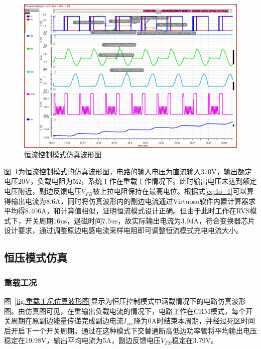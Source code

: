 \begin{figure}[htbp] 
    \centering
    \includegraphics[width=0.8\linewidth]{figures/constant_current.png}
    \caption{恒流控制模式仿真波形图}
    \label{fig:恒流控制模式仿真波形图}
\end{figure} 

图~\ref{fig:恒流控制模式仿真波形图}为恒流控制模式的仿真波形图，电路的输入电压为直流输入370V，输出额定电压20V，负载电阻为5Ω，系统工作在重载工作情况下。此时输出电压未达到额定电压附近，副边反馈电压$V_{FB}$被上拉电阻保持在最高电位。根据式\eqref{eq:Io_1}可以算得输出电流为8.6A，同时将仿真波形内的副边电流通过Virtuoso软件内置计算器求平均得8.406A，和计算值相似，证明恒流模式设计正确。但由于此时工作在RVS模式下，开关周期16us，退磁时间7.5us，故实际输出电流为3.94A，符合变换器芯片设计要求，通过调整原边电感电流采样电阻即可调整恒流模式充电电流大小。

\subsection{恒压模式仿真}

\subsubsection{重载工况}


图~\ref{fig:重载工况仿真波形图}显示为恒压控制模式中满载情况下的电路仿真波形图。由仿真图可见，在重输出负载电流的情况下，电路工作在CRM模式，每个开关周期在原副边能量传递完成副边电流$I_{sec}$降为0A时结束本周期，并经过死区时间后开启下一个开关周期。通过在这种模式下交替通断高低边功率管将平均输出电压稳定在19.98V，输出平均电流为5A，副边反馈电压$V_{FB}$稳定在3.79V。

